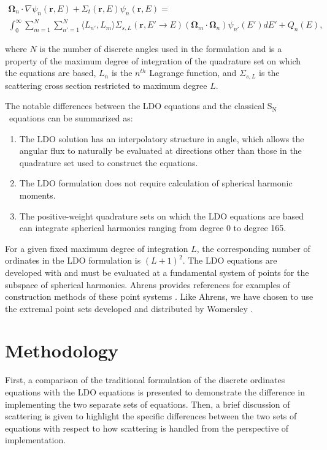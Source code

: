 \documentclass{article} %
\newcommand{\bo}{\mathbf\Omega}
\newcommand{\vecr}{\textbf{r}}
\newcommand{\sn}{S$_\mathrm{N}$}
\begin{document}
\begin{multline}
\bo_n\cdot\nabla\psi_{n}(\vecr,E) + 
\Sigma_{t}(\vecr,E)\psi_{n}(\vecr,E) = \\
\int_0^\infty\sum_{m=1}^{N}\sum_{n'=1}^{N}\langle L_{n'},L_{m}\rangle
\Sigma_{s,L}(\vecr,E'\rightarrow E)(\bo_{m}\cdot\bo_n)\psi_{n'}(E')dE'
+ Q_{n}(E),
\end{multline}

\noindent where $N$ is the number of discrete angles used in the formulation
and is a property of the maximum degree of integration of the quadrature set
on which the equations are based, $L_n$ is the $n^{th}$ Lagrange function, and
$\Sigma_{s,L}$ is the scattering cross section restricted to maximum degree
$L$.

The notable differences between the LDO equations and the classical \sn\
equations can be summarized as:

\begin{enumerate}
\item{The LDO solution has an interpolatory structure in angle, which allows
      the angular flux to naturally be evaluated at directions other than those
      in the quadrature set used to construct the equations.}
\item{The LDO formulation does not require calculation of spherical harmonic
      moments.}
\item{The positive-weight quadrature sets on which the LDO equations are based
      can integrate spherical harmonics ranging from degree 0 to degree 165.}
\end{enumerate}

For a given fixed maximum degree of integration $L$, the corresponding number
of ordinates in the LDO formulation is $(L+1)^2$. The LDO equations are
developed with and must be evaluated at a fundamental system of points for the
subspace of spherical harmonics. Ahrens provides references for examples of
construction methods of these point systems \cite{ahrens}. Like Ahrens, we
have chosen to use the extremal point sets developed and distributed by
Womersley \cite{wom}.

\section{Methodology}

First, a comparison of the traditional formulation of the discrete ordinates
equations with the LDO equations is presented to demonstrate the difference 
in implementing the two separate sets of equations. Then, a brief discussion of 
scattering is given to highlight the specific differences between the two sets
of equations with respect to how scattering is handled from the perspective of 
implementation.
\end{document}
